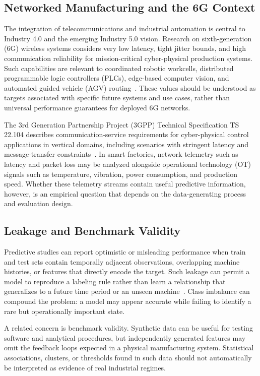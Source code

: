 \documentclass[conference]{IEEEtran}
\begin{document}
\subsection{Networked Manufacturing and the 6G Context}
The integration of telecommunications and industrial automation is central to Industry 4.0 and the emerging Industry 5.0 vision. Research on sixth-generation (6G) wireless systems considers very low latency, tight jitter bounds, and high communication reliability for mission-critical cyber-physical production systems. Such capabilities are relevant to coordinated robotic workcells, distributed programmable logic controllers (PLCs), edge-based computer vision, and automated guided vehicle (AGV) routing~\cite{haque2025urllc, ibrahim2025urllc, paudyal2025gnb, alves2021beyond}. These values should be understood as targets associated with specific future systems and use cases, rather than universal performance guarantees for deployed 6G networks.

The 3rd Generation Partnership Project (3GPP) Technical Specification TS 22.104 describes communication-service requirements for cyber-physical control applications in vertical domains, including scenarios with stringent latency and message-transfer constraints~\cite{tgpp22104}. In smart factories, network telemetry such as latency and packet loss may be analyzed alongside operational technology (OT) signals such as temperature, vibration, power consumption, and production speed. Whether these telemetry streams contain useful predictive information, however, is an empirical question that depends on the data-generating process and evaluation design.

\subsection{Leakage and Benchmark Validity}
Predictive studies can report optimistic or misleading performance when train and test sets contain temporally adjacent observations, overlapping machine histories, or features that directly encode the target. Such leakage can permit a model to reproduce a labeling rule rather than learn a relationship that generalizes to a future time period or an unseen machine~\cite{kapoor2023leakage, kaufman2012leakage, lopez2018advances}. Class imbalance can compound the problem: a model may appear accurate while failing to identify a rare but operationally important state.

A related concern is benchmark validity. Synthetic data can be useful for testing software and analytical procedures, but independently generated features may omit the feedback loops expected in a physical manufacturing system. Statistical associations, clusters, or thresholds found in such data should not automatically be interpreted as evidence of real industrial regimes.
\end{document}
